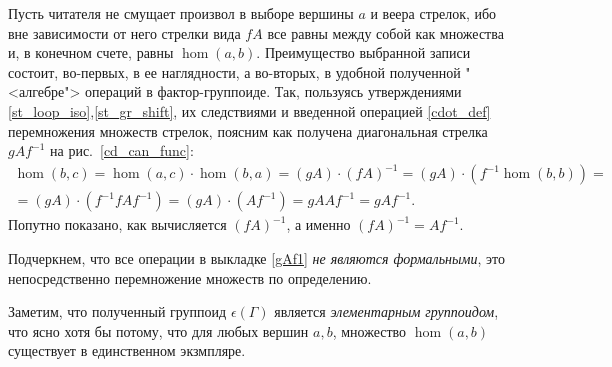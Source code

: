     Пусть читателя не смущает произвол в выборе вершины $a$ и веера стрелок, ибо 
    вне зависимости от него стрелки вида $fA$ все равны между собой как 
    множества и, в конечном счете, равны $\hom(a,b)$. Преимущество выбранной 
    записи состоит, во-первых, в ее наглядности, а во-вторых, в удобной полученной 
    "<алгебре"> операций в фактор-группоиде. Так, пользуясь утверждениями 
    \ref{st_loop_iso},\ref{st_gr_shift}, их следствиями и введенной операцией
    \ref{cdot_def} перемножения множеств стрелок, поясним как получена 
    диагональная стрелка $gAf^{-1}$ на рис.~\ref{cd_can_func}:
    \begin{multline}\label{gAf1}
        \hom(b,c) = \hom(a,c) \cdot \hom(b,a) = (gA) \cdot (fA)^{-1} 
        = (gA) \cdot (f^{-1} \hom(b,b)) = \\
        = (gA) \cdot (f^{-1} fAf^{-1}) = (gA) \cdot (Af^{-1}) = g A A f^{-1} = gAf^{-1}.
    \end{multline}
    Попутно показано, как вычисляется $(fA)^{-1}$, а именно 
    $(fA)^{-1} = Af^{-1}$.

    Подчеркнем, что все операции в выкладке \eqref{gAf1} \emph{не являются 
    формальными}, это непосредственно перемножение множеств по определению.

    Заметим, что полученный группоид $\epsilon(\Gamma)$ является 
    \emph{элементарным группоидом}, что ясно хотя бы потому, что для любых 
    вершин $a,b$, множество $\hom(a,b)$ существует в единственном экзмпляре.
